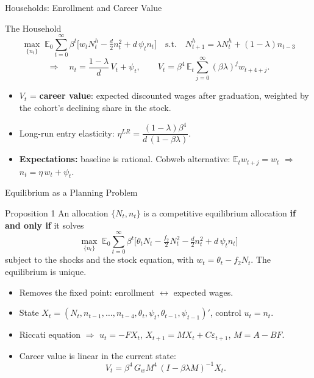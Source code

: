 \documentclass[10pt]{beamer}
\newcommand{\E}{\mathbb{E}}
\begin{document}
\begin{frame}{Households: Enrollment and Career Value}
  \begin{block}{The Household}
    \[
      \max_{\{n_t\}}\;\E_0\sum_{t=0}^\infty\beta^t\Big[w_tN^h_t-\tfrac{d}{2}n_t^2+d\,\psi_t n_t\Big]
      \quad\text{s.t.}\quad N^h_{t+1}=\lambda N^h_t+(1-\lambda)n_{t-3}
    \]
    \[
      \Longrightarrow\quad
      \boxed{n_t=\frac{1-\lambda}{d}\,V_t+\psi_t},\qquad
      V_t=\beta^4\,\E_t\sum_{j=0}^\infty(\beta\lambda)^j w_{t+4+j}.
    \]
  \end{block}
  \begin{itemize}\small
    \item $V_t$ = \textbf{career value}: expected discounted wages after graduation, weighted by the cohort's declining share in the stock.
    \item Long-run entry elasticity: \;$\eta^{LR}=\dfrac{(1-\lambda)\beta^4}{d\,(1-\beta\lambda)}$.
    \item \textbf{Expectations:} baseline is rational. \alert{Cobweb} alternative: $\E_t w_{t+j}=w_t$ $\Rightarrow$ $n_t=\eta\,w_t+\psi_t$.
  \end{itemize}
\end{frame}

\begin{frame}{Equilibrium as a Planning Problem}
  \begin{block}{Proposition 1}
    An allocation $\{N_t,n_t\}$ is a competitive equilibrium allocation \textbf{if and only if} it solves
    \[
      \max_{\{n_t\}}\;\E_0\sum_{t=0}^\infty\beta^t\Big[\theta_tN_t-\tfrac{f_2}{2}N_t^2-\tfrac{d}{2}n_t^2+d\,\psi_tn_t\Big]
    \]
    subject to the shocks and the stock equation, with $w_t=\theta_t-f_2N_t$. The equilibrium is unique.
  \end{block}
  \begin{itemize}
    \item Removes the fixed point: enrollment $\leftrightarrow$ expected wages.
    \item State $X_t=(N_t,n_{t-1},\dots,n_{t-4},\theta_t,\psi_t,\theta_{t-1},\psi_{t-1})'$, control $u_t=n_t$.
    \item Riccati equation $\Rightarrow$ $u_t=-FX_t$,\; $X_{t+1}=MX_t+C\varepsilon_{t+1}$,\; $M=A-BF$.
    \item Career value is \alert{linear in the current state}:
      \[ V_t=\beta^4\,G_wM^4\,(I-\beta\lambda M)^{-1}X_t . \]
  \end{itemize}
\end{frame}
\end{document}
